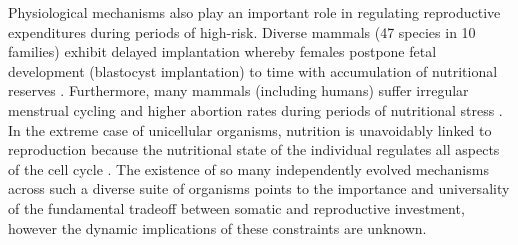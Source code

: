 \documentclass[12pt,english]{article}
\begin{document}
\begin{spacing}{1.9}
Physiological mechanisms also play an important role in regulating reproductive expenditures during periods of high-risk.
Diverse mammals (47 species in 10 families) exhibit delayed implantation whereby females postpone fetal development (blastocyst implantation) to time with accumulation of nutritional reserves \citep{Mead:1989dt,Sandell:1990kw}. %
Furthermore, many mammals (including humans) suffer irregular menstrual cycling and higher abortion rates during periods of nutritional stress \citep{Bulik:1999eo,Trites:2003cc}.
In the extreme case of unicellular organisms, nutrition is unavoidably linked to reproduction because the nutritional state of the individual regulates all aspects of the cell cycle \citep{Glazier:2009hq}.
The existence of so many independently evolved mechanisms across such a diverse suite of organisms points to the importance and universality of the fundamental tradeoff between somatic and reproductive investment, however the dynamic implications of these constraints are unknown.


\end{spacing}
\end{document}
